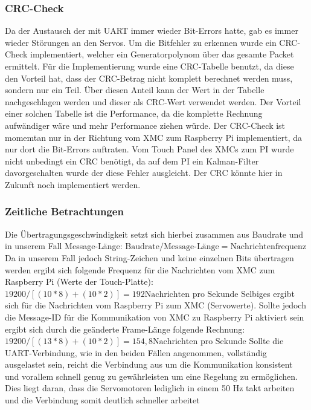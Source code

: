 \documentclass[12pt,a4paper,bibliography=totoc,listof=totoc]{scrartcl}
\begin{document}
\subsubsection{CRC-Check}
Da der Austausch der mit UART immer wieder Bit-Errors hatte, gab es immer wieder Störungen an den Servos.
Um die Bitfehler zu erkennen wurde ein CRC-Check implementiert, welcher ein Generatorpolynom über das
gesamte Packet ermittelt. Für die Implementierung wurde eine CRC-Tabelle benutzt, da diese den Vorteil hat,
dass der CRC-Betrag nicht komplett berechnet werden muss, sondern nur ein Teil. Über diesen Anteil kann 
der Wert in der Tabelle nachgeschlagen werden und dieser als CRC-Wert verwendet werden. Der Vorteil einer solchen
Tabelle ist die Performance, da die komplette Rechnung aufwändiger wäre und mehr Performance ziehen würde. Der CRC-Check ist momemtan nur in
der Richtung vom XMC zum Raspberry Pi implementiert, da nur dort die Bit-Errors auftraten. Vom Touch Panel des XMCs zum PI wurde nicht unbedingt ein CRC benötigt,
da auf dem PI ein Kalman-Filter davorgeschalten wurde der diese Fehler ausgleicht. 
Der CRC könnte hier in Zukunft noch implementiert werden.
\subsubsection {Zeitliche Betrachtungen}

Die Übertragungsgeschwindigkeit setzt sich hierbei zusammen aus Baudrate und in unserem Fall Message-Länge:\newline
$\text{Baudrate}/ \text{Message-Länge} = \text {Nachrichtenfrequenz} $\newline
Da in unserem Fall jedoch String-Zeichen und keine einzelnen Bits übertragen werden ergibt sich folgende Frequenz für 
die Nachrichten vom XMC zum Raspberry Pi (Werte der Touch-Platte):\newline
$ 19200/[(10*8)+(10*2)]= 192 \text {Nachrichten pro Sekunde}$\newline
Selbiges ergibt sich für die Nachrichten vom Raspberry Pi zum XMC (Servowerte). Sollte jedoch die Message-ID für die Kommunikation 
von XMC zu Raspberry Pi aktiviert sein ergibt sich durch die geänderte Frame-Länge folgende Rechnung:\newline
$19200 /[(13*8)+(10*2)]=154,8\text {Nachrichten pro Sekunde}$ \newline
Sollte die UART-Verbindung, wie in den beiden Fällen angenommen, vollständig ausgelastet sein, reicht die Verbindung aus um die 
Kommunikation konsistent und vorallem schnell genug zu gewährleisten um eine Regelung zu ermöglichen. Dies liegt daran, dass die 
Servomotoren lediglich in einem 50 Hz takt arbeiten und die Verbindung somit deutlich schneller arbeitet
\end{document}
